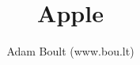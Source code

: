 \documentclass[oneside]{book}
\begin{document}
\author{Adam Boult (www.bou.lt)}
\title{Apple}
\maketitle

\setcounter{tocdepth}{0}
\tableofcontents


\end{document}

